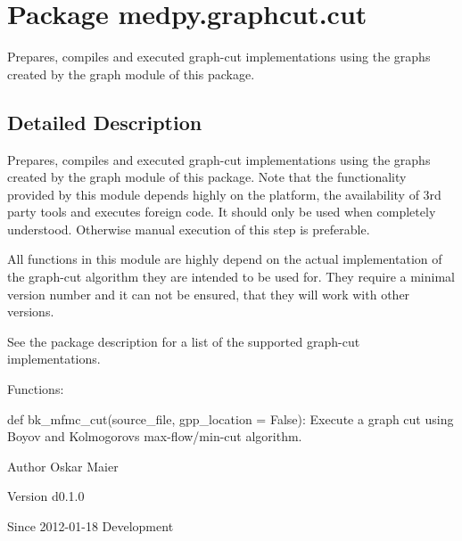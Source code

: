 \hypertarget{namespacemedpy_1_1graphcut_1_1cut}{
\section{Package medpy.graphcut.cut}
\label{namespacemedpy_1_1graphcut_1_1cut}
}


Prepares, compiles and executed graph-\/cut implementations using the graphs created by the graph module of this package.  




\subsection{Detailed Description}
Prepares, compiles and executed graph-\/cut implementations using the graphs created by the graph module of this package. Note that the functionality provided by this module depends highly on the platform, the availability of 3rd party tools and executes foreign code. It should only be used when completely understood. Otherwise manual execution of this step is preferable.

All functions in this module are highly depend on the actual implementation of the graph-\/cut algorithm they are intended to be used for. They require a minimal version number and it can not be ensured, that they will work with other versions.

See the package description for a list of the supported graph-\/cut implementations.

Functions:
\begin{DoxyItemize}
\item def bk\_\-mfmc\_\-cut(source\_\-file, gpp\_\-location = False): Execute a graph cut using Boyov and Kolmogorovs max-\/flow/min-\/cut algorithm.
\end{DoxyItemize}

\begin{DoxyAuthor}{Author}
Oskar Maier 
\end{DoxyAuthor}
\begin{DoxyVersion}{Version}
d0.1.0 
\end{DoxyVersion}
\begin{DoxySince}{Since}
2012-\/01-\/18  Development 
\end{DoxySince}
